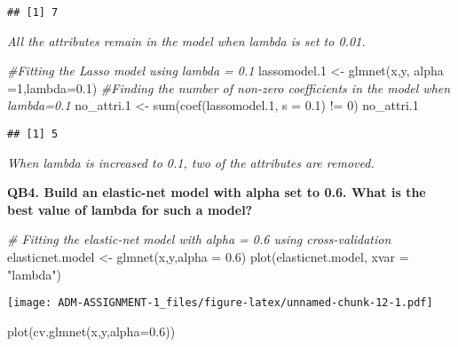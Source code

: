 \documentclass[
]{article}
\newenvironment{Shaded}{\begin{snugshade}}{\end{snugshade}}
\newcommand{\AttributeTok}[1]{\textcolor[rgb]{0.77,0.63,0.00}{#1}}
\newcommand{\CommentTok}[1]{\textcolor[rgb]{0.56,0.35,0.01}{\textit{#1}}}
\newcommand{\DecValTok}[1]{\textcolor[rgb]{0.00,0.00,0.81}{#1}}
\newcommand{\FloatTok}[1]{\textcolor[rgb]{0.00,0.00,0.81}{#1}}
\newcommand{\FunctionTok}[1]{\textcolor[rgb]{0.00,0.00,0.00}{#1}}
\newcommand{\NormalTok}[1]{#1}
\newcommand{\OtherTok}[1]{\textcolor[rgb]{0.56,0.35,0.01}{#1}}
\newcommand{\SpecialCharTok}[1]{\textcolor[rgb]{0.00,0.00,0.00}{#1}}
\newcommand{\StringTok}[1]{\textcolor[rgb]{0.31,0.60,0.02}{#1}}
\begin{document}
\begin{verbatim}
## [1] 7
\end{verbatim}

\emph{All the attributes remain in the model when lambda is set to
0.01.}

\begin{Shaded}
\begin{Highlighting}[]
\CommentTok{\#Fitting the Lasso model using lambda = 0.1}
\NormalTok{lassomodel}\FloatTok{.1} \OtherTok{\textless{}{-}} \FunctionTok{glmnet}\NormalTok{(x,y, }\AttributeTok{alpha =}\DecValTok{1}\NormalTok{,}\AttributeTok{lambda=}\FloatTok{0.1}\NormalTok{)}
\CommentTok{\#Finding the number of non{-}zero coefficients in the model when lambda=0.1}
\NormalTok{no\_attri}\FloatTok{.1} \OtherTok{\textless{}{-}} \FunctionTok{sum}\NormalTok{(}\FunctionTok{coef}\NormalTok{(lassomodel}\FloatTok{.1}\NormalTok{, }\AttributeTok{s =} \FloatTok{0.1}\NormalTok{) }\SpecialCharTok{!=} \DecValTok{0}\NormalTok{)}
\NormalTok{no\_attri}\FloatTok{.1}
\end{Highlighting}
\end{Shaded}

\begin{verbatim}
## [1] 5
\end{verbatim}

\emph{When lambda is increased to 0.1, two of the attributes are
removed.}

\textbf{QB4. Build an elastic-net model with alpha set to 0.6. What is
the best value of lambda for such a model?}

\begin{Shaded}
\begin{Highlighting}[]
\CommentTok{\# Fitting the elastic{-}net model with alpha = 0.6 using cross{-}validation}
\NormalTok{elasticnet.model }\OtherTok{\textless{}{-}} \FunctionTok{glmnet}\NormalTok{(x,y,}\AttributeTok{alpha =} \FloatTok{0.6}\NormalTok{)}
\FunctionTok{plot}\NormalTok{(elasticnet.model, }\AttributeTok{xvar =} \StringTok{"lambda"}\NormalTok{)}
\end{Highlighting}
\end{Shaded}

\texttt{[image: ADM-ASSIGNMENT-1\_files/figure-latex/unnamed-chunk-12-1.pdf]}

\begin{Shaded}
\begin{Highlighting}[]
\FunctionTok{plot}\NormalTok{(}\FunctionTok{cv.glmnet}\NormalTok{(x,y,}\AttributeTok{alpha=}\FloatTok{0.6}\NormalTok{))}
\end{Highlighting}
\end{Shaded}
\end{document}
